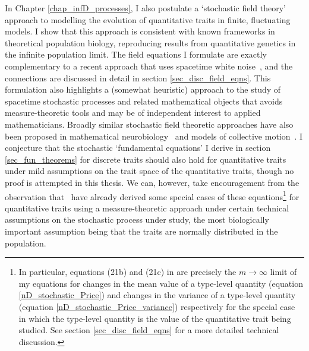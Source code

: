 In Chapter \ref{chap_infD_processes}, I also postulate a `stochastic field theory' approach to modelling the evolution of quantitative traits in finite, fluctuating models. I show that this approach is consistent with known frameworks in theoretical population biology, reproducing results from quantitative genetics in the infinite population limit. The field equations I formulate are exactly complementary to a recent approach that uses spacetime white noise~\citep{week_white_2021}, and the connections are discussed in detail in section \ref{sec_disc_field_eqns}. This formulation also highlights a (somewhat heuristic) approach to the study of spacetime stochastic processes and related mathematical objects that avoids measure-theoretic tools and may be of independent interest to applied mathematicians. Broadly similar stochastic field theoretic approaches have also been proposed in mathematical neurobiology~\citep{buice_field-theoretic_2007,bressloff_stochastic_2010,coombes_neural_2014} and models of collective motion~\citep{o_laighleis_minimal_2018}. I  conjecture that the stochastic `fundamental equations' I derive in section \ref{sec_fun_theorems} for discrete traits should also hold for quantitative traits under mild assumptions on the trait space of the quantitative traits, though no proof is attempted in this thesis. We can, however, take encouragement from the observation that~\cite{week_white_2021} have already derived some special cases of these equations\footnote{In particular, equations (21b) and (21c) in \cite{week_white_2021} are precisely the $m \to \infty$ limit of my equations for changes in the mean value of a type-level quantity (equation \ref{nD_stochastic_Price}) and changes in the variance of a type-level quantity (equation \ref{nD_stochastic_Price_variance}) respectively for the special case in which the type-level quantity is the value of the quantitative trait being studied. See section \ref{sec_disc_field_eqns} for a more detailed technical discussion.} for quantitative traits using a measure-theoretic approach under certain technical assumptions on the stochastic process under study, the most biologically important assumption being that the traits are normally distributed in the population.
  
